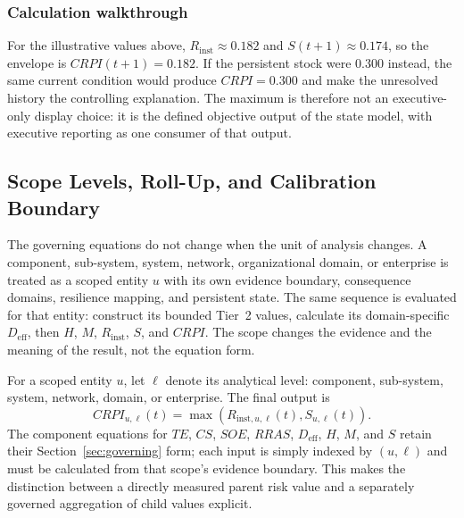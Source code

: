 \documentclass[11pt]{article}
\begin{document}
\subsubsection{Calculation walkthrough}
For the illustrative values above, $R_{\mathrm{inst}}\approx0.182$ and
$S(t+1)\approx0.174$, so the envelope is $CRPI(t+1)=0.182$. If the persistent stock
were $0.300$ instead, the same current condition would produce $CRPI=0.300$ and make
the unresolved history the controlling explanation. The maximum is therefore not an
executive-only display choice: it is the defined objective output of the state model,
with executive reporting as one consumer of that output.

\subsection{Scope Levels, Roll-Up, and Calibration Boundary}
The governing equations do not change when the unit of analysis changes. A component,
sub-system, system, network, organizational domain, or enterprise is treated as a
scoped entity $u$ with its own evidence boundary, consequence domains, resilience
mapping, and persistent state. The same sequence is evaluated for that entity:
construct its bounded Tier~2 values, calculate its domain-specific $D_{\mathrm{eff}}$,
then $H$, $M$, $R_{\mathrm{inst}}$, $S$, and $CRPI$. The scope changes the evidence and
the meaning of the result, not the equation form.

For a scoped entity $u$, let $\ell$ denote its analytical level: component,
sub-system, system, network, domain, or enterprise. The final output is
\begin{equation}
  CRPI_{u,\ell}(t)=
    \max\!\left(R_{\mathrm{inst},u,\ell}(t),S_{u,\ell}(t)\right).
  \label{eq:scoped-crpi}
\end{equation}
The component equations for $TE$, $CS$, $SOE$, $RRAS$, $D_{\mathrm{eff}}$, $H$, $M$,
and $S$ retain their Section~\ref{sec:governing} form; each input is simply indexed by $(u,\ell)$ and
must be calculated from that scope's evidence boundary. This makes the distinction
between a directly measured parent risk value and a separately governed aggregation
of child values explicit.
\end{document}
